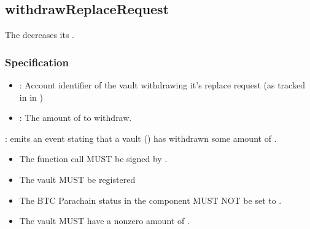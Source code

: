 \documentclass[a4paper,10pt,english]{sphinxmanual}
\begin{document}
\subsection{withdrawReplaceRequest}
\label{\detokenize{spec/replace:withdrawreplacerequest}}\label{\detokenize{spec/replace:id5}}
The  decreases its .


\subsubsection{Specification}
\label{\detokenize{spec/replace:id6}}


\begin{itemize}
\item {} 
: Account identifier of the vault withdrawing it’s replace request (as tracked in  in {\hyperref[\detokenize{spec/vault-registry:vault-registry}]{}})

\item {} 
: The amount of  to withdraw.

\end{itemize}


: emits an event stating that a vault () has withdrawn some amount of .

\begin{itemize}
\item {} 
The function call MUST be signed by .

\item {} 
The vault MUST be registered

\item {} 
The BTC Parachain status in the {\hyperref[\detokenize{spec/security:security}]{}} component MUST NOT be set to .

\item {} 
The vault MUST have a non\sphinxhyphen{}zero amount of .

\end{itemize}
\end{document}
